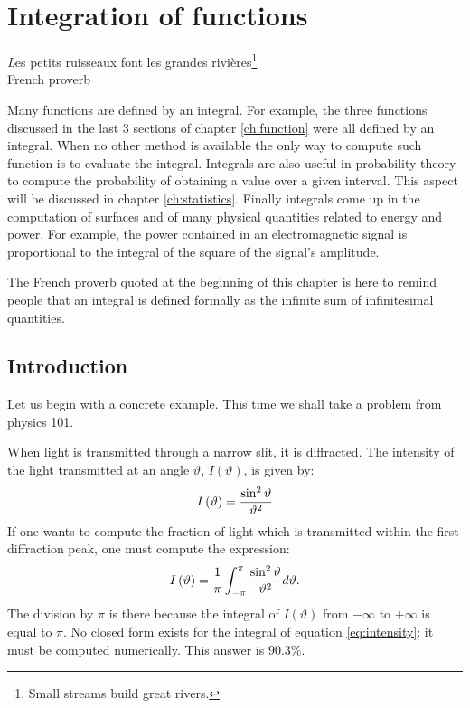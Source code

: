 %
%

\chapter{Integration of functions}
\label{ch:integration}
\begin{flushright}
{\textsl Les petits ruisseaux font les grandes rivi\`{e}res}\footnote{Small streams build great rivers.}\\ French
proverb
\end{flushright}
\vspace{1 ex}Many functions are defined by an integral. For
example, the three functions discussed in the last 3 sections of
chapter \ref{ch:function} were all defined by an integral. When no
other method is available the only way to compute such function is
to evaluate the integral. Integrals are also useful in probability
theory to compute the probability of obtaining a value over a
given interval. This aspect will be discussed in chapter
\ref{ch:statistics}. Finally integrals come up in the computation
of surfaces and of many physical quantities related to energy and
power. For example, the power contained in an electromagnetic
signal is proportional to the integral of the square of the
signal's amplitude.

The French proverb quoted at the beginning of this chapter is here
to remind people that an integral is defined formally as the
infinite sum of infinitesimal quantities.

\section{Introduction}
Let us begin with a concrete example. This time we shall take a
problem from physics 101.

When light is transmitted through a narrow slit, it is diffracted.
The intensity of the light transmitted at an angle $\vartheta$,
$I\left(\vartheta\right)$, is given by:
\begin{equation}
  I\left(\vartheta\right)={\sin^2\vartheta \over \vartheta^2}
\end{equation}
If one wants to compute the fraction of light which is transmitted
within the first diffraction peak, one must compute the
expression:
\begin{equation}
\label{eq:intensity}
  I\left(\vartheta\right)={1 \over\pi}\int_{-\pi}^{\pi}{\sin^2\vartheta \over
  \vartheta^2}d\vartheta.
\end{equation}
The division by $\pi$ is there because the integral of
$I\left(\vartheta\right)$ from $-\infty$ to $+\infty$ is equal to
$\pi$. No closed form exists for the integral of equation
\ref{eq:intensity}: it must be computed numerically. This answer
is $90.3\%$.

